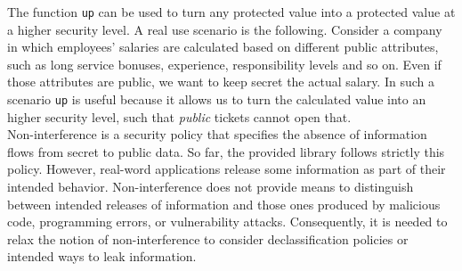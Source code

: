 The function \texttt{up} can be used to turn any protected value into a protected value at a higher security level. A real use scenario is the following. Consider a company in which employees' salaries are calculated based on different public attributes, such as long service bonuses, experience, responsibility levels and so on. Even if those attributes are public, we want to keep secret the actual salary. In such a scenario \texttt{up} is useful because it allows us to turn the calculated value into an higher security level, such that \textit{public} tickets cannot open that. \\
Non-interference is a security policy that specifies the absence of information flows from secret to public data. So far, the provided library follows strictly this policy. However, real-word applications release some information as part of their intended behavior. Non-interference does not provide means to distinguish between intended releases of information and those ones produced by malicious code, programming errors, or vulnerability attacks. Consequently, it is needed to relax the notion of non-interference to consider declassification policies or intended ways to leak information.

